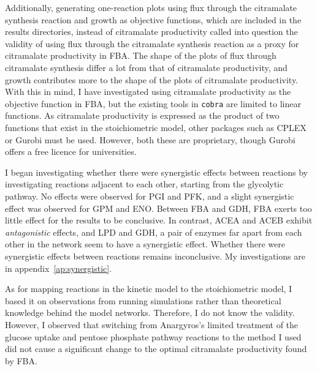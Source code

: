 \documentclass[parskip=full]{scrreprt}
\begin{document}
Additionally, generating one-reaction plots using flux through the citramalate synthesis reaction and growth as objective functions, which are included in the results directories, instead of citramalate productivity called into question the validity of using flux through the citramalate synthesis reaction as a proxy for citramalate productivity in FBA. The shape of the plots of flux through citramalate synthesis differ a lot from that of citramalate productivity, and growth contributes more to the shape of the plots of citramalate productivity. With this in mind, I have investigated using citramalate productivity as the objective function in FBA, but the existing tools in \texttt{cobra} are limited to linear functions. As citramalate productivity is expressed as the product of two functions that exist in the stoichiometric model, other packages such as CPLEX or Gurobi must be used. However, both these are proprietary, though Gurobi offers a free licence for universities.

I began investigating whether there were synergistic effects between reactions by investigating reactions adjacent to each other, starting from the glycolytic pathway. No effects were observed for PGI and PFK, and a slight synergistic effect was observed for GPM and ENO. Between FBA and GDH, FBA exerts too little effect for the results to be conclusive. In contrast, ACEA and ACEB exhibit \emph{antagonistic} effects, and LPD and GDH, a pair of enzymes far apart from each other in the network seem to have a synergistic effect. Whether there were synergistic effects between reactions remains inconclusive. My investigations are in appendix~\ref{ap:synergistic}.

As for mapping reactions in the kinetic model to the stoichiometric model, I based it on observations from running simulations rather than theoretical knowledge behind the model networks. Therefore, I do not know the validity. However, I observed that switching from Anargyros's limited treatment of the glucose uptake and pentose phosphate pathway reactions to the method I used did not cause a significant change to the optimal citramalate productivity found by FBA.
\end{document}
